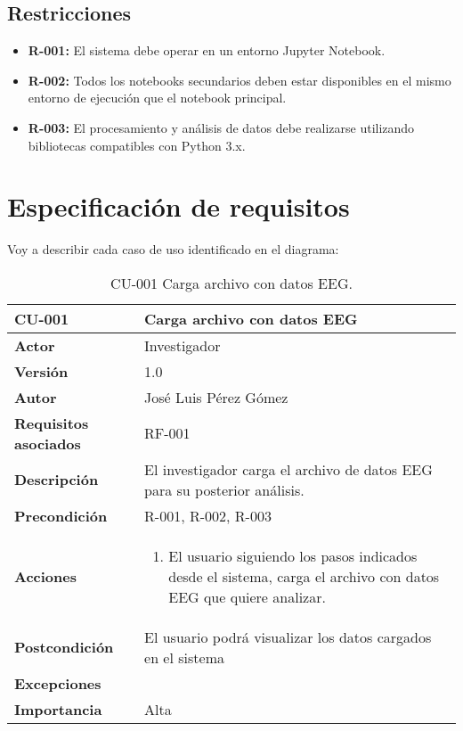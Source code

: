 \subsection{Restricciones}

\begin{itemize}
\tightlist
\item
  \textbf{R-001:} El sistema debe operar en un entorno Jupyter Notebook.
 
\item
  \textbf{R-002:} Todos los notebooks secundarios deben estar disponibles en el mismo entorno de ejecución que el notebook principal.

\item
  \textbf{R-003:} El procesamiento y análisis de datos debe realizarse utilizando bibliotecas compatibles con Python 3.x.

\end{itemize}




\section{Especificación de requisitos}

Voy a describir cada caso de uso identificado en el diagrama:



\begin{table}[p]
	\centering
	\begin{tabularx}{\linewidth}{ p{} p{} }
		\toprule
		\textbf{CU-001}    & \textbf{Carga archivo con datos EEG}\\
		\toprule		
		\textbf{Actor}              & Investigador    \\ 
		\textbf{Versión}              & 1.0    \\
		\textbf{Autor}                & José Luis Pérez Gómez \\
		\textbf{Requisitos asociados} & RF-001 \\
		\textbf{Descripción}          & El investigador carga el archivo de datos EEG para su posterior análisis. \\
		\textbf{Precondición}         & R-001, R-002, R-003\\
		\textbf{Acciones}             &
		\begin{enumerate}
			\def\labelenumi{\arabic{enumi}.}
			\tightlist
			\item El usuario siguiendo los pasos indicados desde el sistema, carga el archivo con datos EEG que quiere analizar.

		\end{enumerate}\\
		\textbf{Postcondición}        & El usuario podrá visualizar los datos cargados en el sistema\\
		\textbf{Excepciones}          &  \\
		\textbf{Importancia}          & Alta \\
		\bottomrule
	\end{tabularx}
	\caption{CU-001 Carga archivo con datos EEG.}
\end{table}



